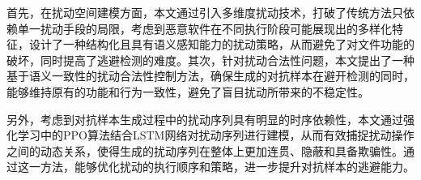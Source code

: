 
首先，在扰动空间建模方面，本文通过引入多维度扰动技术，打破了传统方法只依赖单一扰动手段的局限，考虑到恶意软件在不同执行阶段可能展现出的多样化特征，设计了一种结构化且具有语义感知能力的扰动策略，从而避免了对文件功能的破坏，同时提高了逃避检测的难度。其次，针对扰动合法性问题，本文提出了一种基于语义一致性的扰动合法性控制方法，确保生成的对抗样本在避开检测的同时，能够维持原有的功能和行为一致性，避免了盲目扰动所带来的不稳定性。


另外，考虑到对抗样本生成过程中的扰动序列具有明显的时序依赖性，本文通过强化学习中的PPO算法结合LSTM网络对扰动序列进行建模，从而有效捕捉扰动操作之间的动态关系，使得生成的扰动序列在整体上更加连贯、隐蔽和具备欺骗性。通过这一方法，能够优化扰动的执行顺序和策略，进一步提升对抗样本的逃避能力。


